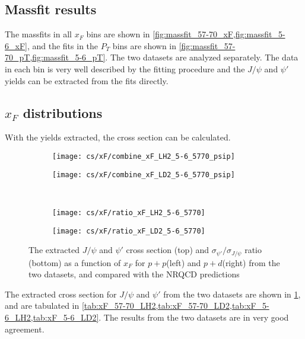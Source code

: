 \documentclass[../main.tex]{subfiles}
\begin{document}
\subsection{Massfit results}
The massfits in all $x_F$ bins are shown in \cref{fig:massfit_57-70_xF,fig:massfit_5-6_xF},
and the fits in the $P_T$ bins are shown in \cref{fig:massfit_57-70_pT,fig:massfit_5-6_pT}.
The two datasets are analyzed separately. The data in each bin is very well described by the fitting procedure
and the $J/\psi$ and $\psi'$ yields can be extracted from the fits directly.

\FloatBarrier

\subsection{\texorpdfstring{$x_F$}{x\_F} distributions}
With the yields extracted, the cross section can be calculated.
\begin{figure}[h!]
	\centering
	\begin{subfigure}{0.45\linewidth}
		\texttt{[image: cs/xF/combine\_xF\_LH2\_5-6\_5770\_psip]}
	\end{subfigure}
	\centering
	\begin{subfigure}{0.45\linewidth}
		\texttt{[image: cs/xF/combine\_xF\_LD2\_5-6\_5770\_psip]}
	\end{subfigure}
	\\
	\begin{subfigure}{0.45\linewidth}
		\texttt{[image: cs/xF/ratio\_xF\_LH2\_5-6\_5770]}
	\end{subfigure}
	\begin{subfigure}{0.45\linewidth}
		\texttt{[image: cs/xF/ratio\_xF\_LD2\_5-6\_5770]}
	\end{subfigure}
	\caption{The extracted $J/\psi$ and $\psi'$ cross section (top) and $\sigma_{\psi'}/\sigma_{J/\psi}$
		ratio (bottom) as a function of $x_F$ for $p+p$(left) and $p+d$(right) from the two datasets,
		and compared with the NRQCD predictions}
	\label{fig:cs_xF}
\end{figure}
The extracted cross section for $J/\psi$ and $\psi'$ from the two datasets are shown in \cref{fig:cs_xF}, and are
tabulated in \cref{tab:xF_57-70_LH2,tab:xF_57-70_LD2,tab:xF_5-6_LH2,tab:xF_5-6_LD2}.
The results from the two datasets are in very good agreement.
\end{document}
